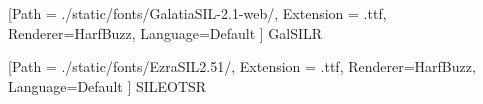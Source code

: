 \usepackage{fontspec}
\usepackage[bidi=basic]{babel}





           [Path = ./static/fonts/GalatiaSIL-2.1-web/,
           Extension = .ttf,
           Renderer=HarfBuzz,
           Language=Default ]
          {GalSILR}

           [Path = ./static/fonts/EzraSIL2.51/,
           Extension = .ttf,
           Renderer=HarfBuzz,
           Language=Default ]
          {SILEOTSR}
